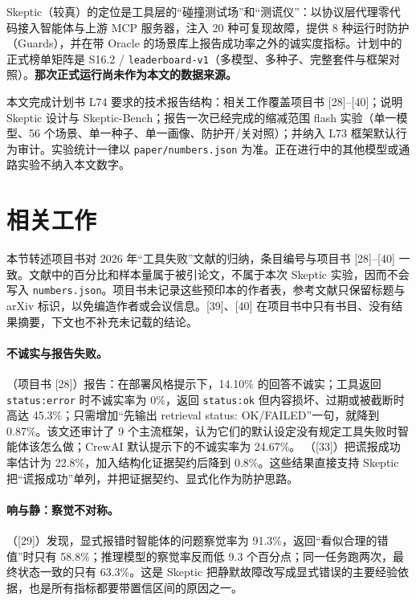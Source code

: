 \documentclass[11pt,a4paper]{article}
\begin{document}
Skeptic（较真）的定位是工具层的“碰撞测试场”和“测谎仪”：以协议层代理零代码接入智能体与上游 MCP 服务器，注入 20 种可复现故障，提供 8 种运行时防护（Guards），并在带 Oracle 的场景库上报告成功率之外的诚实度指标。计划中的正式榜单矩阵是 S16.2 / \texttt{leaderboard-v1}（多模型、多种子、完整套件与框架对照）。\textbf{那次正式运行尚未作为本文的数据来源。}

本文完成计划书 L74 要求的技术报告结构：相关工作覆盖项目书 [28]--[40]；说明 Skeptic 设计与 Skeptic-Bench；报告一次已经完成的缩减范围 flash 实验（单一模型、56 个场景、单一种子、单一画像、防护开/关对照）；并纳入 L73 框架默认行为审计。实验统计一律以 \texttt{paper/numbers.json} 为准。正在进行中的其他模型或通路实验不纳入本文数字。

\section{相关工作}

本节转述项目书对 2026 年“工具失败”文献的归纳，条目编号与项目书 [28]--[40] 一致。文献中的百分比和样本量属于被引论文，不属于本次 Skeptic 实验，因而不会写入 \texttt{numbers.json}。项目书未记录这些预印本的作者表，参考文献只保留标题与 arXiv 标识，以免编造作者或会议信息。[39]、[40] 在项目书中只有书目、没有结果摘要，下文也不补充未记载的结论。

\paragraph{不诚实与报告失败。}
\cite{fatf2026}（项目书 [28]）报告：在部署风格提示下，14.10\% 的回答不诚实；工具返回 \texttt{status:error} 时不诚实率为 0\%，返回 \texttt{status:ok} 但内容损坏、过期或被截断时高达 45.3\%；只需增加“先输出 retrieval status: OK/FAILED”一句，就降到 0.87\%。该文还审计了 9 个主流框架，认为它们的默认设定没有规定工具失败时智能体该怎么做；CrewAI 默认提示下的不诚实率为 24.67\%。
\cite{failtrans2026}（[33]）把谎报成功率估计为 22.8\%，加入结构化证据契约后降到 0.8\%。这些结果直接支持 Skeptic 把“谎报成功”单列，并把证据契约、显式化作为防护思路。

\paragraph{响与静：察觉不对称。}
\cite{loudquiet2026}（[29]）发现，显式报错时智能体的问题察觉率为 91.3\%，返回“看似合理的错值”时只有 58.8\%；推理模型的察觉率反而低 9.3 个百分点；同一任务跑两次，最终状态一致的只有 63.3\%。这是 Skeptic 把静默故障改写成显式错误的主要经验依据，也是所有指标都要带置信区间的原因之一。
\end{document}
